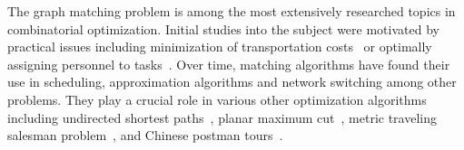 The graph matching problem is among the most extensively researched topics in combinatorial optimization. Initial studies into the subject were motivated by practical issues including minimization of transportation costs~\cite{hitchcock1941distribution} or optimally assigning personnel to tasks~\cite{thorndike1950problem}. Over time, matching algorithms have found their use in scheduling, approximation algorithms and network switching among other problems. They play a crucial role in various other optimization algorithms including undirected shortest paths~\cite{lawler2001combinatorial}, planar maximum cut~\cite{hadlock1975finding}, metric traveling salesman problem~\cite{christofides1976worst}, and Chinese postman tours~\cite{edmonds1973matching}.
